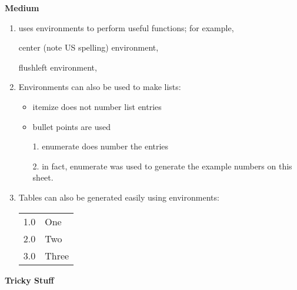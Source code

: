 \documentclass[11pt]{article}
\begin{document}
	\large \textbf{Medium}
	
	\begin{enumerate}
		
		\item \LaTeXe  uses environments to perform useful functions; for example,\\
		\begin{center}
			center (note US spelling) environment,
		\end{center}
		flushleft environment,\\
		
		\item Environments can also be used to make lists:
		
		\begin{itemize}
			\item itemize does not number list entries
			\item bullet points are used
		\end{itemize}
		
		\begin{enumerate}	
			\item[1.] enumerate does number the entries
			\item[2.] in fact, enumerate was used to generate the example numbers on this sheet.
		\end{enumerate}
		
		
		\item Tables can also be generated easily using environments:\\
		\centering
		\begin{tabular}{ll}
			1.0 &One\\
			2.0 &Two\\
			3.0 &Three\\
		\end{tabular}
	\end{enumerate}
	
	\large \textbf{Tricky Stuff}
	
\end{document}
